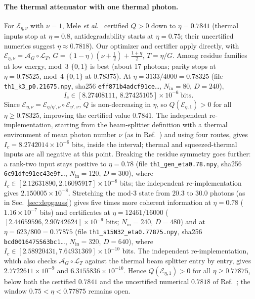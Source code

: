 \documentclass[aps,pra,reprint,superscriptaddress,nofootinbib,longbibliography,floatfix]{revtex4-2}
\theoremstyle{remark}
\newcommand{\Ic}{I_c}
\newcommand{\Amp}{\mathcal{A}}
\newcommand{\Loss}{\mathcal{L}}
\begin{document}
\paragraph*{The thermal attenuator with one thermal photon.} For $\mathcal E_{\eta,\nu}$ with $\nu=1$, Mele
\textit{et al.}~\cite{mele2026thermal} certified $Q>0$ down to $\eta=0.7841$ (thermal inputs stop at
$\eta=0.8$, antidegradability starts at $\eta=0.75$; their uncertified numerics suggest $\eta\approx0.7818$).
Our optimizer and certifier apply directly, with $\mathcal E_{\eta,\nu}=\Amp_G\circ\Loss_T$,
$G=(1-\eta)(\nu+\frac12)+\frac{1+\eta}2$, $T=\eta/G$. Among residue families at low energy, mod~3 $\{0,1\}$
is best (about 17 photons; parity stops at $\eta=0.78525$, mod~4 $\{0,1\}$ at $0.78375$). At
$\eta=3133/4000=0.78325$ (file \texttt{th1\_k3\_p0.21675.npy}, sha256 \texttt{eff871b4adcf91ce}\dots,
$N_{\mathrm{in}}=80$, $D=240$),
\begin{equation}
  \Ic\in[8.27408111,\ 8.27425105]\times10^{-6}\ \text{bits}.
\end{equation}
Since $\mathcal E_{\eta,\nu}=\mathcal E_{\eta/\eta',\nu}\circ\mathcal E_{\eta',\nu}$, $Q$ is non-decreasing in
$\eta$, so $Q(\mathcal E_{\eta,1})>0$ for all $\eta\ge0.78325$, improving the certified value $0.7841$. The
independent re-implementation, starting from the beam-splitter definition with a thermal environment of
mean photon number $\nu$ (as in Ref.~\cite{mele2026thermal}) and using four routes, gives
$\Ic=8.2742014\times10^{-6}$ bits, inside the interval; thermal and squeezed-thermal inputs are all
negative at this point. Breaking the residue symmetry goes further: a rank-two input stays positive to
$\eta=0.78$ (file \texttt{th1\_gen\_eta0.78.npy}, sha256 \texttt{6c91dfe91ec43e9f}\dots, $N_{\mathrm{in}}=120$,
$D=300$), where $\Ic\in[2.12631890,2.16095917]\times10^{-8}$ bits; the independent re-implementation gives
$2.150005\times10^{-8}$. Stretching the mod-3 state from $20.3$ to $30.0$ photons (as in Sec.~\ref{sec:depgauss}) gives five times
more coherent information at $\eta=0.78$ ($1.16\times10^{-7}$ bits) and certificates at $\eta=12461/16000$
($[2.44659596,2.90742624]\times10^{-9}$ bits; $N_{\mathrm{in}}=240$, $D=480$) and at $\eta=623/800=0.77875$
(file \texttt{th1\_s15N32\_eta0.77875.npy}, sha256 \texttt{bcd0016475563bc1}\dots, $N_{\mathrm{in}}=320$,
$D=640$), where $\Ic\in[2.58920431,7.64931369]\times10^{-10}$ bits. The independent re-implementation,
which also checks $\Amp_G\circ\Loss_T$ against the thermal beam splitter entry by entry, gives
$2.7722611\times10^{-9}$ and $6.3155836\times10^{-10}$. Hence $Q(\mathcal E_{\eta,1})>0$ for all $\eta\ge0.77875$,
below both the certified $0.7841$ and the uncertified numerical $0.7818$ of Ref.~\cite{mele2026thermal};
the window $0.75<\eta<0.77875$ remains open.
\end{document}
